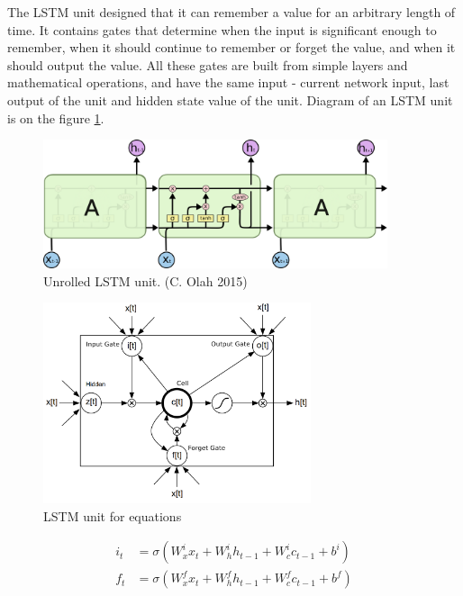 The LSTM unit designed that it can remember a value for an arbitrary length of time. It contains gates that determine when the input is significant enough to remember, when it should continue to remember or forget the value, and when it should output the value. All these gates are built from simple layers and mathematical operations, and have the same input - current network input, last output of the unit and hidden state value of the unit. Diagram of an LSTM unit is on the figure \ref{fig:lstm-unroll}.

\begin{figure}[!ht]
	\centering
	\includegraphics[width=0.9\textwidth]{./fig/LSTM3-chain.png}
	\caption{Unrolled LSTM unit. (C. Olah 2015)
		\label{fig:lstm-unroll}}
\end{figure}


\begin{figure}[!ht]
	\centering
	\includegraphics[width=0.7\textwidth]{./fig/LSTM-equations.png}
	\caption{LSTM unit for equations
		\label{fig:lstm-equations}}
\end{figure}

\begin{align}
	i_t &= \sigma(W_x^ix_t + W_h^ih_{t-1} + W_c^ic_{t-1} + b^i) \label{eq:lstm1}\\
	f_t &= \sigma(W_x^fx_t + W_h^fh_{t-1} + W_c^fc_{t-1} + b^f) \label{eq:lstm2}
\end{align}

